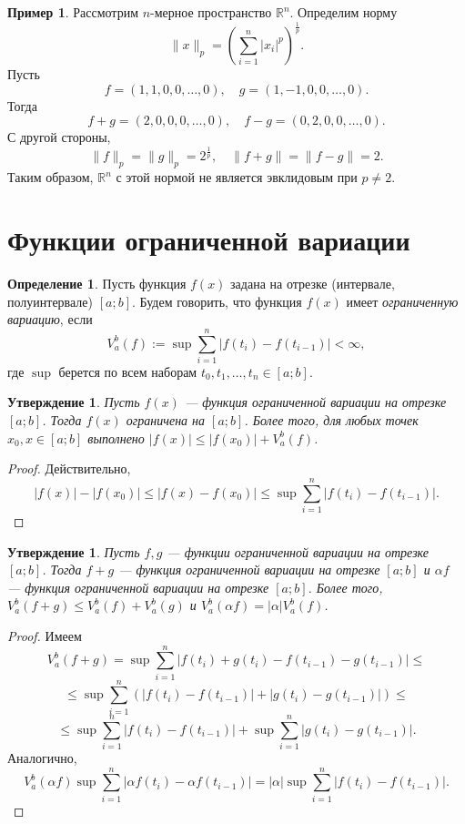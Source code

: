 \documentclass[12pt, titlepage, oneside]{amsbook}
\newcommand{\RR}{\mathbb{R}}
\newtheorem{claim}[theorem]{Утверждение}
\theoremstyle{definition}
\newtheorem{example}[theorem]{Пример}
\newtheorem{definition}[theorem]{Определение}
\theoremstyle{remark}
\begin{document}
\begin{example}
	Рассмотрим $n$-мерное пространство $\RR^n$. Определим норму $$\|x\|_p=\left(\sum\limits_{i=1}^n|x_i|^p\right)^{\frac{1}{p}}.$$ Пусть $$f=(1,1,0,0,\ldots,0),\quad g=(1,-1,0,0,\ldots,0).$$ Тогда $$f+g=(2,0,0,0,\ldots,0),\quad f-g=(0,2,0,0,\ldots,0).$$ С другой стороны, $$\|f\|_p=\|g\|_p=2^{\frac{1}{p}},\quad \|f+g\|=\|f-g\|=2.$$ Таким образом, $\RR^n$ с этой нормой не является эвклидовым при $p\neq 2$.
\end{example}

\section{Функции ограниченной вариации}

\begin{definition}
	Пусть функция $f(x)$ задана на отрезке (интервале, полуинтервале) $[a;b]$. Будем говорить, что функция $f(x)$ имеет \emph{ограниченную вариацию}, если $$V_a^b(f):=\sup\sum\limits_{i=1}^n|f(t_i)-f(t_{i-1})|<\infty,$$ где $\sup$ берется по всем наборам $t_0,t_1,\ldots,t_n\in[a;b]$.
\end{definition}

\begin{claim}
	\label{Var1} Пусть $f(x)$ --- функция ограниченной вариации на отрезке $[a;b]$. Тогда $f(x)$ ограничена на $[a;b]$. Более того, для любых точек $x_0,x\in [a;b]$ выполнено $|f(x)|\leq |f(x_0)|+V_a^b(f)$.
\end{claim}

\begin{proof}
	Действительно, $$|f(x)|-|f(x_0)|\leq |f(x)-f(x_0)|\leq \sup\sum\limits_{i=1}^n|f(t_i)-f(t_{i-1})|.$$
\end{proof}

\begin{claim}
	\label{Var2}
	Пусть $f,g$ --- функции ограниченной вариации на отрезке $[a;b]$. Тогда $f+g$ --- функция ограниченной вариации на отрезке $[a;b]$ и $\alpha f$ --- функция ограниченной вариации на отрезке $[a;b]$. Более того, $V_a^b(f+g)\leq V_a^b(f)+V_a^b(g)$ и $V_a^b(\alpha f)=|\alpha|V_a^b(f)$.
\end{claim}

\begin{proof}
	Имеем $$V_a^b(f+g)=\sup\sum\limits_{i=1}^n|f(t_i)+g(t_i)-f(t_{i-1})-g(t_{i-1})|\leq $$ $$\leq\sup\sum\limits_{i=1}^n(|f(t_i)-f(t_{i-1})|+|g(t_i)-g(t_{i-1})|)\leq $$ $$\leq\sup\sum\limits_{i=1}^n|f(t_i)-f(t_{i-1})|+\sup\sum\limits_{i=1}^n|g(t_i)-g(t_{i-1})|.$$ Аналогично, $$V_a^b(\alpha f)\sup\sum\limits_{i=1}^n|\alpha f(t_i)-\alpha f(t_{i-1})|=|\alpha|\sup\sum\limits_{i=1}^n|f(t_i)-f(t_{i-1})|.$$
\end{proof}
\end{document}
